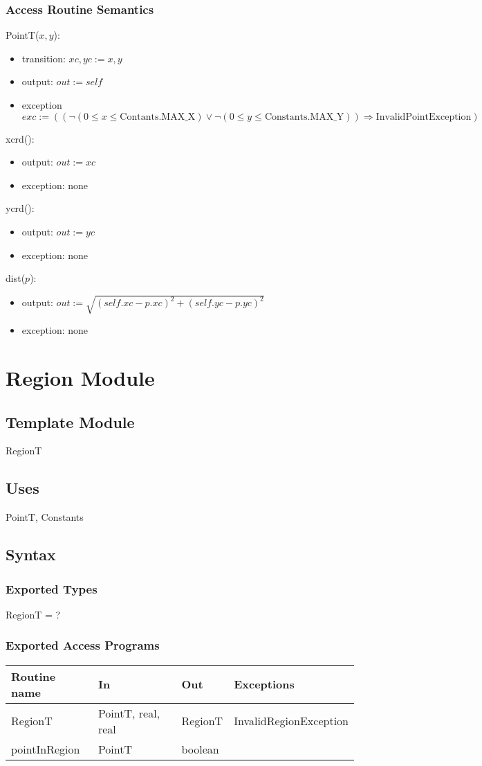\documentclass[12pt]{article}
\begin{document}
\subsubsection* {Access Routine Semantics}
PointT($x, y$):
\begin{itemize}
\item transition: $xc, yc := x, y$
\item output: $out := \mathit{self}$
\item exception
 $exc := ((\neg(0 \leq x \leq \mbox{Contants.MAX\_X}) \vee \neg(0 \leq y \leq \mbox{Constants.MAX\_Y})) \Rightarrow
\mbox{InvalidPointException})$
\end{itemize}
\noindent xcrd():
\begin{itemize}
\item output: $out := xc$
\item exception: none
\end{itemize}
\noindent ycrd():
\begin{itemize}
\item output: $out := yc$
\item exception: none
\end{itemize}
\noindent dist($p$):
\begin{itemize}
\item output: $out := \sqrt{(\mathit{self}.xc - p.xc)^2 + (\mathit{self}.yc - p.yc)^2}$
\item exception: none
\end{itemize}
\newpage
\section* {Region Module}
\subsection* {Template Module}
RegionT
\subsection* {Uses}
PointT, Constants
\subsection* {Syntax}
\subsubsection* {Exported Types}
RegionT = ?
\subsubsection* {Exported Access Programs}
\begin{tabular}{| l | l | l | l |}
\hline
\textbf{Routine name} & \textbf{In} & \textbf{Out} & \textbf{Exceptions}\\
\hline
RegionT & PointT, real, real & RegionT & InvalidRegionException\\
\hline
pointInRegion & PointT & boolean & ~\\
\hline 
\end{tabular}
\end{document}
